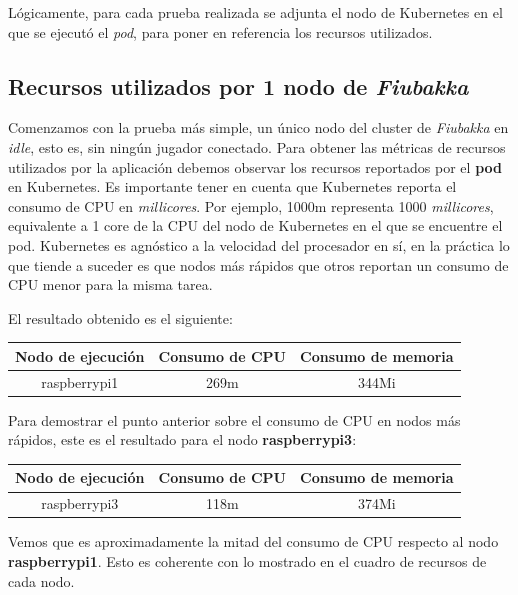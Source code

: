 \noindent Lógicamente, para cada prueba realizada se adjunta el nodo de Kubernetes en el que se ejecutó el \textit{pod}, para poner en referencia los recursos utilizados.

\subsection{Recursos utilizados por 1 nodo de \textit{Fiubakka}}

\noindent Comenzamos con la prueba más simple, un único nodo del cluster de \textit{Fiubakka} en \textit{idle}, esto es, sin ningún jugador conectado.
Para obtener las métricas de recursos utilizados por la aplicación debemos observar los recursos reportados por el \textbf{pod} en Kubernetes.
Es importante tener en cuenta que Kubernetes reporta el consumo de CPU en \textit{millicores}. Por ejemplo, 1000m representa 1000 \textit{millicores}, equivalente
a 1 core de la CPU del nodo de Kubernetes en el que se encuentre el pod. Kubernetes es agnóstico a la velocidad del procesador en sí, en la práctica lo que tiende a suceder
es que nodos más rápidos que otros reportan un consumo de CPU menor para la misma tarea.

\noindent El resultado obtenido es el siguiente:

\begin{center}
\begin{tabular}{|c|c|c|}
    \hline
    \textbf{Nodo de ejecución} & \textbf{Consumo de CPU} & \textbf{Consumo de memoria} \\
    \hline
    raspberrypi1 & 269m & 344Mi \\
    \hline
\end{tabular}
\end{center}

\noindent Para demostrar el punto anterior sobre el consumo de CPU en nodos más rápidos, este es el resultado para el nodo \textbf{raspberrypi3}:

\begin{center}
\begin{tabular}{|c|c|c|}
    \hline
    \textbf{Nodo de ejecución} & \textbf{Consumo de CPU} & \textbf{Consumo de memoria} \\
    \hline
    raspberrypi3 & 118m & 374Mi \\
    \hline
\end{tabular}
\end{center}

\noindent Vemos que es aproximadamente la mitad del consumo de CPU respecto al nodo \textbf{raspberrypi1}. Esto es coherente con lo mostrado en el cuadro de recursos de cada
nodo.

